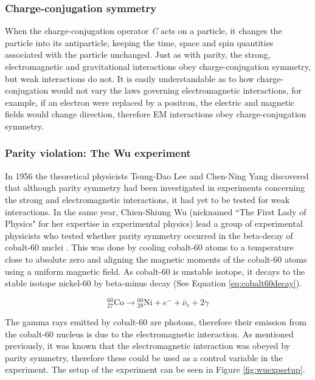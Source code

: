 \documentclass[11pt,oneside,a4paper]{article}
\begin{document}
\subsubsection{Charge-conjugation symmetry}

When the charge-conjugation operator \textit{C} acts on a particle, it changes the particle into its antiparticle, keeping the time, space and spin quantities associated with the particle unchanged. Just as with parity, the strong, electromagnetic and gravitational interactions obey charge-conjugation symmetry, but weak interactions do not. It is easily understandable as to how charge-conjugation would not vary the laws governing electromagnetic interactions, for example, if an electron were replaced by a positron, the electric and magnetic fields would change direction, therefore EM interactions obey charge-conjugation symmetry.

\subsubsection{Parity violation: The Wu experiment}
In 1956 the theoretical physicists Tsung-Dao Lee and Chen-Ning Yang discovered that although parity symmetry had been investigated in experiments concerning the strong and electromagnetic interactions, it had yet to be tested for weak interactions. In the same year, Chien-Shiung Wu (nicknamed ``The First Lady of Physics" for her expertise in experimental physics) lead a group of experimental physicists who tested whether parity symmetry occurred in the beta-decay of cobalt-60 nuclei \cite{wupaper}. This was done by cooling cobalt-60 atoms to a temperature close to absolute zero and aligning the magnetic moments of the cobalt-60 atoms using a uniform magnetic field. As cobalt-60 is unstable isotope, it decays to the stable isotope nickel-60 by beta-minus decay (See Equation \ref{eq:cobalt60decay}).

\begin{equation}
\label{eq:cobalt60decay}
{}_{{27}}^{{60}}{\text{Co}}\rightarrow {}_{{28}}^{{60}}{\text{Ni}}+e^{-}+{\bar {\nu }}_{e}+2{\gamma }
\end{equation}

The gamma rays emitted by cobalt-60 are photons, therefore their emission from the cobalt-60 nucleus is due to the electromagnetic interaction. As mentioned previously, it was known that the electromagnetic interaction was obeyed by parity symmetry, therefore these could be used as a control variable in the experiment. The setup of the experiment can be seen in Figure \ref{fig:wuexpsetup}.
\end{document}
